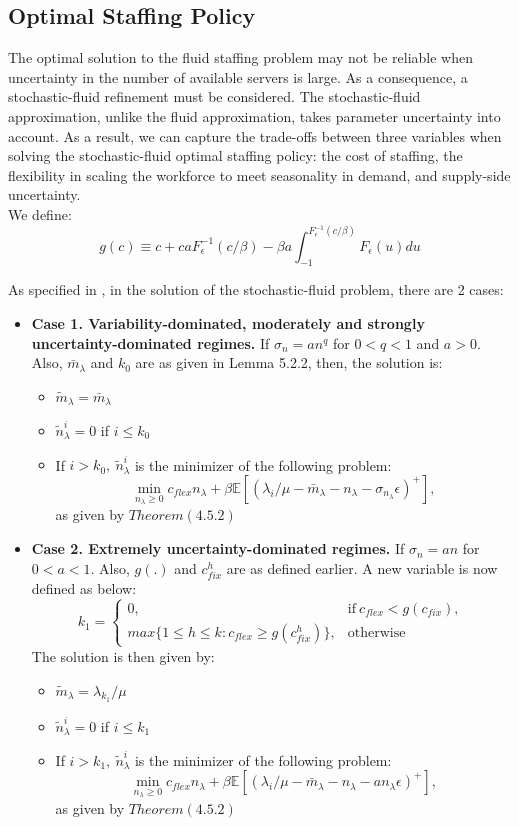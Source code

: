 \subsection{Optimal Staffing Policy} 
The optimal solution to the fluid staffing problem may not be reliable when uncertainty in the number of available servers is large. As a consequence, a stochastic-fluid refinement must be considered. The stochastic-fluid approximation, unlike the fluid approximation, takes parameter uncertainty into account. As a result, we can capture the trade-offs between three variables when solving the stochastic-fluid optimal staffing policy: the cost of staffing, the flexibility in scaling the workforce to meet seasonality in demand, and supply-side uncertainty. \\ We define:
\[g(c) \equiv c + caF_{\epsilon}^{-1}(c/\beta)-\beta a\int_{-1}^{F_{\epsilon}^{-1}(c/\beta)}F_{\epsilon}(u) du\]
\begin{theorem}
As specified in \cite{dong}, in the solution of the stochastic-fluid problem, there are 2 cases:
\begin{itemize}
    \item \textbf{Case 1. Variability-dominated, moderately and strongly uncertainty-dominated
regimes.}  If $\sigma_n = an^q$ for $0 < q < 1$ and $a > 0$. Also, $\bar{m}_{\lambda}$ and $k_0$ are as given in Lemma 5.2.2, then, the solution is:
\begin{itemize}
    \item $\tilde{m}_{\lambda}=\bar{m}_{\lambda}$
    \item $\tilde{n}_{\lambda}^i=0$ if $i \leq k_0$
    \item If $i>k_0, \ \tilde{n}_{\lambda}^i$ is the minimizer of the following problem:
    \[\min_{n_{\lambda}\geq0} c_{flex}n_{\lambda} + \beta\mathbb{E}[(\lambda_i/\mu - \bar{m}_{\lambda} - n_{\lambda} -\sigma_{n_{\lambda}}\epsilon)^+],\]
    as given by  $Theorem(4.5.2)$
\end{itemize}
    \item \textbf{Case 2. Extremely uncertainty-dominated
regimes.}  If $\sigma_n = an$ for $0 < a < 1$. Also, $g(.)$ and $c_{fix}^h$ are as defined earlier. A new variable is now defined as below:
$$
k_1 = 
\begin{cases}
      0, & \text{if}\ c_{flex} < g(c_{fix}), \\
      max\{1 \leq h \leq k: c_{flex} \geq g(c_{fix}^h)\}, & \text{otherwise}
    \end{cases}
$$
The solution is then given by:
\begin{itemize}
    \item $\tilde{m}_{\lambda}=\lambda_{k_1}/\mu$
    \item $\tilde{n}_{\lambda}^i=0$ if $i \leq k_1$
    \item If $i>k_1, \ \tilde{n}_{\lambda}^i$ is the minimizer of the following problem:
    \[\min_{n_{\lambda}\geq0} c_{flex}n_{\lambda} + \beta\mathbb{E}[(\lambda_i/\mu - \bar{m}_{\lambda} - n_{\lambda} -an_{\lambda}\epsilon)^+],\]
    as given by $Theorem(4.5.2)$ 
\end{itemize}
\end{itemize}
\end{theorem}
